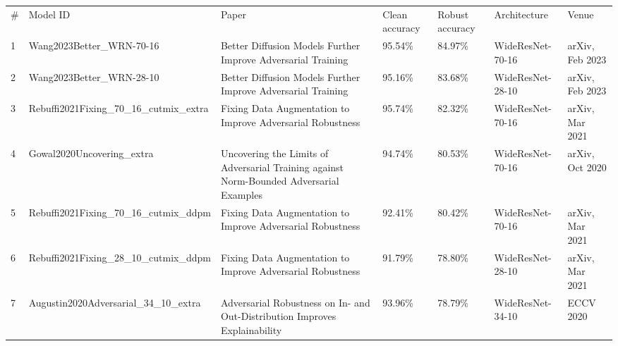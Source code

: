 \begin{table}[]
    \begin{tabular}{lllllll}
    \# & Model ID                                 & Paper                                                                                                              & Clean accuracy & Robust accuracy & Architecture     & Venue                                                      \\
    1  & Wang2023Better\_WRN-70-16                & Better Diffusion Models Further Improve Adversarial Training                                                       & 95.54\%        & 84.97\%         & WideResNet-70-16 & arXiv, Feb 2023                                            \\
    2  & Wang2023Better\_WRN-28-10                & Better Diffusion Models Further Improve Adversarial Training                                                       & 95.16\%        & 83.68\%         & WideResNet-28-10 & arXiv, Feb 2023                                            \\
    3  & Rebuffi2021Fixing\_70\_16\_cutmix\_extra & Fixing Data Augmentation to Improve Adversarial Robustness                                                         & 95.74\%        & 82.32\%         & WideResNet-70-16 & arXiv, Mar 2021                                            \\
    4  & Gowal2020Uncovering\_extra               & Uncovering the Limits of Adversarial Training against Norm-Bounded Adversarial Examples                            & 94.74\%        & 80.53\%         & WideResNet-70-16 & arXiv, Oct 2020                                            \\
    5  & Rebuffi2021Fixing\_70\_16\_cutmix\_ddpm  & Fixing Data Augmentation to Improve Adversarial Robustness                                                         & 92.41\%        & 80.42\%         & WideResNet-70-16 & arXiv, Mar 2021                                            \\
    6  & Rebuffi2021Fixing\_28\_10\_cutmix\_ddpm  & Fixing Data Augmentation to Improve Adversarial Robustness                                                         & 91.79\%        & 78.80\%         & WideResNet-28-10 & arXiv, Mar 2021                                            \\
    7  & Augustin2020Adversarial\_34\_10\_extra   & Adversarial Robustness on In- and Out-Distribution Improves Explainability                                         & 93.96\%        & 78.79\%         & WideResNet-34-10 & ECCV 2020                                                  \\

\end{tabular}
\end{table}
